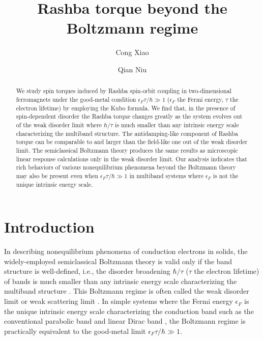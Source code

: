 \documentclass
[aps,pra,amsfonts,amssymb,twocolumn,amsmath,preprintnumbers,nofootinbib,floatfix,
showpacs,superscriptaddress]{revtex4-1}%
\begin{document}
\title{Rashba torque beyond the Boltzmann regime}
\author{Cong Xiao}

\author{Qian Niu}
\begin{abstract}
We study spin torques induced by Rashba spin-orbit coupling in two-dimensional
ferromagnets under the good-metal condition $\epsilon_{F}\tau/\hbar\gg1$
($\epsilon_{F}$ the Fermi energy, $\tau$ the electron lifetime) by employing
the Kubo formula. We find that, in the presence of spin-dependent disorder the
Rashba torque changes greatly as the system evolves out of the weak disorder
limit where $\hbar/\tau$ is much smaller than any intrinsic energy scale
characterizing the multiband structure. The antidamping-like component of
Rashba torque can be comparable to and larger than the field-like one out of the
weak disorder limit. The semiclassical Boltzmann theory produces the same
results as microscopic linear response calculations only in the weak disorder
limit. Our analysis indicates that rich behaviors of various nonequilibrium
phenomena beyond the Boltzmann theory may also be present even when
$\epsilon_{F}\tau/\hbar\gg1$ in multiband systems where $\epsilon_{F}$ is not
the unique intrinsic energy scale.
\end{abstract}
\maketitle



\section{Introduction}

In describing nonequilibrium phenomena of conduction electrons in solids, the
widely-employed semiclassical Boltzmann theory \cite{Ziman} is valid only if
the band structure is well-defined, i.e., the disorder broadening $\hbar/\tau$
($\tau$ the electron lifetime) of bands is much smaller than any intrinsic
energy scale characterizing the multiband structure
\cite{Sinitsyn2008,Xiao2017SOT,Luttinger}. This Boltzmann regime is often
called the weak disorder limit \cite{Sinitsyn2008,Xiao2017SOT,Luttinger} or
weak scattering limit \cite{Nunner2007}. In simple systems where the Fermi
energy $\epsilon_{F}$ is the unique intrinsic energy scale characterizing the
conduction band such as the conventional parabolic band \cite{Lee1985} and
linear Dirac band \cite{Sinitsyn}, the Boltzmann regime is practically
equivalent to the good-metal limit $\epsilon_{F}\tau/\hbar\gg1$.
\end{document}
